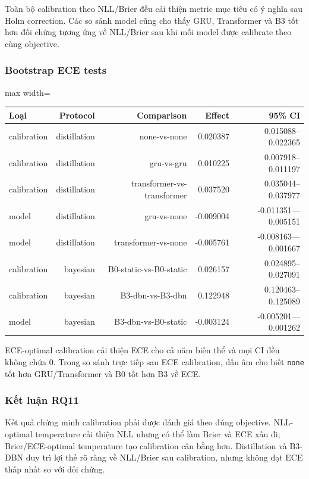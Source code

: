 Toàn bộ calibration theo NLL/Brier đều cải thiện metric mục tiêu có ý nghĩa sau Holm correction. Các so sánh model cũng cho thấy GRU, Transformer và B3 tốt hơn đối chứng tương ứng về NLL/Brier sau khi mỗi model được calibrate theo cùng objective.

\subsubsection*{Bootstrap ECE tests}

\begin{table}[!htbp]
\centering
\scriptsize
\setlength{\tabcolsep}{2.5pt}
\begin{adjustbox}{max width=\textwidth}
\begin{tabular}{@{}lrrrr@{}}
\toprule
Loại & Protocol & Comparison & Effect & 95\% CI \\
\midrule
calibration & distillation & none-vs-none & 0.020387 & 0.015088--0.022365 \\
calibration & distillation & gru-vs-gru & 0.010225 & 0.007918--0.011197 \\
calibration & distillation & transformer-vs-transformer & 0.037520 & 0.035044--0.037977 \\
model & distillation & gru-vs-none & -0.009004 & -0.011351---0.005151 \\
model & distillation & transformer-vs-none & -0.005761 & -0.008163---0.001667 \\
calibration & bayesian & B0-static-vs-B0-static & 0.026157 & 0.024895--0.027091 \\
calibration & bayesian & B3-dbn-vs-B3-dbn & 0.122948 & 0.120463--0.125089 \\
model & bayesian & B3-dbn-vs-B0-static & -0.003124 & -0.005201---0.001262 \\
\bottomrule
\end{tabular}
\end{adjustbox}
\end{table}

ECE-optimal calibration cải thiện ECE cho cả năm biến thể và mọi CI đều không chứa 0. Trong so sánh trực tiếp sau ECE calibration, dấu âm cho biết \texttt{none} tốt hơn GRU/Transformer và B0 tốt hơn B3 về ECE.

\subsubsection*{Kết luận RQ11}

Kết quả chứng minh calibration phải được đánh giá theo đúng objective. NLL-optimal temperature cải thiện NLL nhưng có thể làm Brier và ECE xấu đi; Brier/ECE-optimal temperature tạo calibration cân bằng hơn. Distillation và B3-DBN duy trì lợi thế rõ ràng về NLL/Brier sau calibration, nhưng không đạt ECE thấp nhất so với đối chứng.

